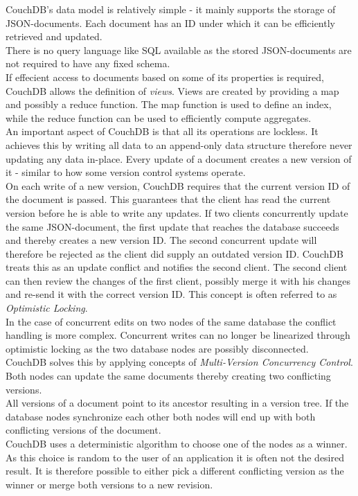 CouchDB's data model is relatively simple - it mainly supports the storage of JSON-documents.
Each document has an ID under which it can be efficiently retrieved and updated.\\
There is no query language like SQL available as the stored JSON-documents are not required to have any fixed schema.\\
If effecient access to documents based on some of its properties is required, CouchDB allows the definition of \emph{views}.
Views are created by providing a map and possibly a reduce function.
The map function is used to define an index, while the reduce function can be used to efficiently compute aggregates.\\

An important aspect of CouchDB is that all its operations are lockless.
It achieves this by writing all data to an append-only data structure therefore never updating any data in-place.
Every update of a document creates a new version of it - similar to how some version control systems operate.\\
On each write of a new version, CouchDB requires that the current version ID of the document is passed.
This guarantees that the client has read the current version before he is able to write any updates.
If two clients concurrently update the same JSON-document, the first update that reaches the database succeeds and thereby creates a new version ID.
The second concurrent update will therefore be rejected as the client did supply an outdated version ID.
CouchDB treats this as an update conflict and notifies the second client.
The second client can then review the changes of the first client, possibly merge it with his changes and re-send it with the correct version ID.
This concept is often referred to as \emph{Optimistic Locking}.\\

In the case of concurrent edits on two nodes of the same database the conflict handling is more complex.
Concurrent writes can no longer be linearized through optimistic locking as the two database nodes are possibly disconnected.\\
CouchDB solves this by applying concepts of \emph{Multi-Version Concurrency Control}.
Both nodes can update the same documents thereby creating two conflicting versions.\\
All versions of a document point to its ancestor resulting in a version tree.
If the database nodes synchronize each other both nodes will end up with both conflicting versions of the document.\\
CouchDB uses a deterministic algorithm to choose one of the nodes as a winner.
As this choice is random to the user of an application it is often not the desired result.
It is therefore possible to either pick a different conflicting version as the winner or merge both versions to a new revision.

